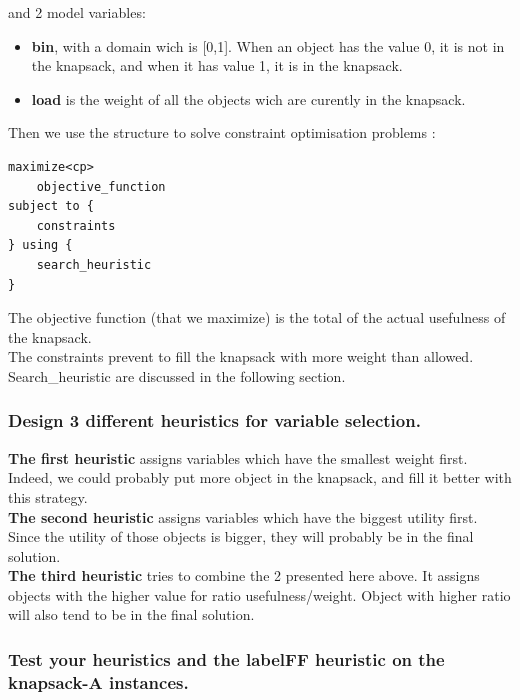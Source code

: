 \documentclass[a4paper ,12pt,french]{article}
\begin{document}
and 2 model variables:
\begin{itemize}
\item \textbf{bin}, with a domain wich is [0,1]. When an object has the value 0, it is not in the knapsack, and when it has value 1, it is in the knapsack.
\item \textbf{load} is the weight of all the objects wich are curently in the knapsack.\\
\end{itemize}

Then we use the structure to solve constraint optimisation problems :
\begin{verbatim}
maximize<cp>
    objective_function
subject to {
    constraints
} using {
    search_heuristic
}
\end{verbatim}

The objective function (that we maximize) is the total of the actual usefulness of the knapsack.\\
The constraints prevent to fill the knapsack with more weight than allowed.\\
Search\_heuristic are discussed in the following section.



\subsubsection{Design 3 different heuristics for variable selection.}
\textbf{The first heuristic} assigns variables which have the smallest weight first. Indeed, we could probably put more object in the knapsack, and fill it better with this strategy.\\

\textbf{The second heuristic} assigns variables which have the biggest utility first. Since the utility of those objects is bigger, they will probably be in the final solution.\\

\textbf{The third heuristic} tries to combine the 2 presented here above. It assigns objects with the higher value for ratio usefulness/weight. Object with higher ratio will also tend to be in the final solution.\\

\subsubsection{Test your heuristics and the labelFF heuristic on the knapsack-A instances.}
\end{document}
